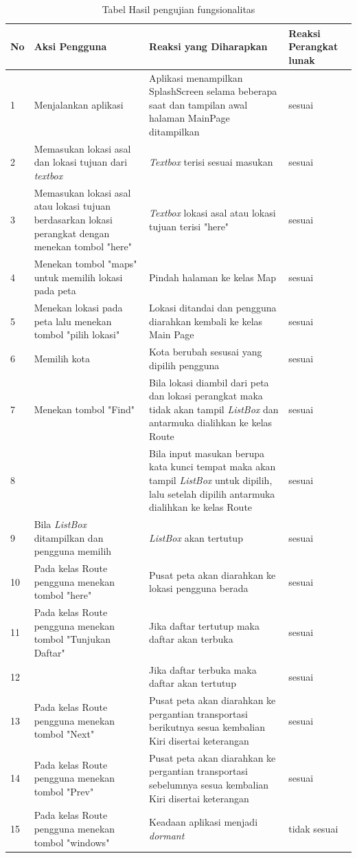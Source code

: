 \begin{table}[h!]
	\centering
		\begin{tabular}{|p{1cm}|p{4cm}|p{6cm}|p{3cm}|}\hline
				No & Aksi Pengguna & Reaksi yang Diharapkan & Reaksi Perangkat lunak \\ \hline
				1 & Menjalankan aplikasi & Aplikasi menampilkan SplashScreen selama beberapa saat dan tampilan awal halaman MainPage ditampilkan & sesuai \\ \hline
				2 & Memasukan lokasi asal dan lokasi tujuan dari \textit{textbox} & \textit{Textbox} terisi sesuai masukan & sesuai \\ \hline
				3 & Memasukan lokasi asal atau lokasi tujuan berdasarkan lokasi perangkat dengan menekan tombol "here" & \textit{Textbox} lokasi asal atau lokasi tujuan terisi "here" & sesuai \\ \hline
				4 & Menekan tombol "maps" untuk memilih lokasi pada peta & Pindah halaman ke kelas Map & sesuai \\ \hline
				5 & Menekan lokasi pada peta lalu menekan tombol "pilih lokasi" & Lokasi ditandai dan pengguna diarahkan kembali ke kelas Main Page & sesuai \\ \hline
				6 & Memilih kota & Kota berubah sesusai yang dipilih pengguna & sesuai \\ \hline
				7 & Menekan tombol "Find" & Bila lokasi diambil dari peta dan lokasi perangkat maka tidak akan tampil \textit{ListBox} dan antarmuka dialihkan ke kelas Route & sesuai \\ \hline
				8 & & Bila input masukan berupa kata kunci tempat maka akan tampil \textit{ListBox} untuk dipilih, lalu setelah dipilih antarmuka dialihkan ke kelas Route & sesuai \\ \hline
				9 & Bila \textit{ListBox} ditampilkan dan pengguna memilih & \textit{ListBox} akan tertutup & sesuai \\ \hline
				10 & Pada kelas Route pengguna menekan tombol "here" & Pusat peta akan diarahkan ke lokasi pengguna berada & sesuai \\ \hline
				11 & Pada kelas Route pengguna menekan tombol "Tunjukan Daftar" & Jika daftar tertutup maka daftar akan terbuka & sesuai \\ \hline
				12 & & Jika daftar terbuka maka daftar akan tertutup & sesuai \\ \hline
				13 & Pada kelas Route pengguna menekan tombol "Next" & Pusat peta akan diarahkan ke pergantian transportasi berikutnya sesua kembalian Kiri disertai keterangan & sesuai \\ \hline
				14 & Pada kelas Route pengguna menekan tombol "Prev" & Pusat peta akan diarahkan ke pergantian transportasi sebelumnya sesua kembalian Kiri disertai keterangan & sesuai \\ \hline
				15 & Pada kelas Route pengguna menekan tombol "windows" & Keadaan aplikasi menjadi \textit{dormant} & tidak sesuai \\ \hline
		\end{tabular}
	\caption{Tabel Hasil pengujian fungsionalitas}
	\label{tab:TabelHasilPengujianFungsionalitas}
\end{table}


